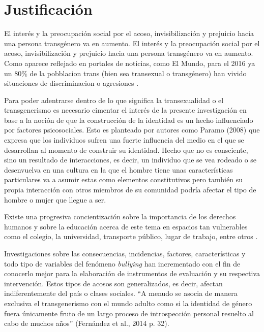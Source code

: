 \section{Justificación}
El interés y la preocupación social por el acoso, invisibilización y prejuicio
hacia una persona transgénero va en aumento. El interés y la preocupación social
por el acoso, invisibilización y prejuicio hacia una persona transgénero va en
aumento. Como aparece reflejado en portales de noticias, como El Mundo, para
el 2016 ya un 80\% de la pobblacion trans (bien sea transexual o transgénero)
han vivido situaciones de discriminacion o agresiones \parencite{Alpuente2016}.



Para poder adentrarse dentro de lo que significa la transexualidad o el
transgenerismo es necesario cimentar el interés de la presente investigación en
base a la noción de que la construcción de la identidad es un hecho influenciado
por factores psicosociales. Esto es planteado por autores como Paramo (2008) que
expresa que los individuos sufren una fuerte influencia del medio en el que se
desarrollan al momento de construir su identidad. Hecho que no es consciente,
sino un resultado de interacciones, es decir, un individuo que se vea rodeado o
se desenvuelva en una cultura en la que el hombre tiene unas características
particulares va a asumir estas como elementos constitutivos pero también su
propia interacción con otros miembros de su comunidad podría afectar el tipo de
hombre o mujer que llegue a ser.

 Existe una progresiva concientización sobre la importancia de los derechos
 humanos y sobre la educación acerca de este tema en espacios tan vulnerables
 como el colegio, la universidad, transporte público, lugar de trabajo, entre
 otros \parencite{Fernandez2014a}.

Investigaciones sobre las consecuencias, incidencias, factores, características
y todo tipo de variables del fenómeno \emph{bullying} han incrementado con el
fin de conocerlo mejor para la elaboración de instrumentos de evaluación y su
respectiva intervención. Estos tipos de acosos son generalizados, es decir,
afectan indiferentemente del país o clases sociales. “A menudo se asocia de
manera exclusiva el transgenerismo con el mundo adulto como si la identidad de
género fuera únicamente fruto de un largo proceso de introspección personal
resuelto al cabo de muchos años” (Fernández et al., 2014 p. 32).


